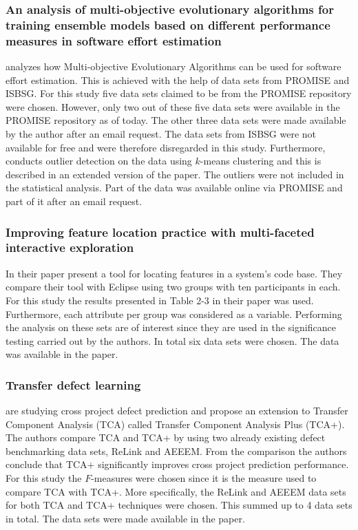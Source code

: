 \subsubsection{An analysis of multi-objective evolutionary algorithms for training ensemble models based on different performance measures in software effort estimation} 
\citet{minku2013analysis} analyzes how Multi-objective Evolutionary Algorithms can be used for software effort estimation. This is achieved with the help of data sets from PROMISE and ISBSG\@. For this study five data sets claimed to be from the PROMISE repository were chosen. However, only two out of these five data sets were available in the PROMISE repository as of today. The other three data sets were made available by the author after an email request. The data sets from ISBSG were not available for free and were therefore disregarded in this study. Furthermore, \citet{minku2013analysis} conducts outlier detection on the data using $k$-means clustering and this is described in an extended version of the paper. The outliers were not included in the statistical analysis. Part of the data was available online via PROMISE and part of it after an email request. 




\subsubsection{Improving feature location practice with multi-faceted interactive exploration}
In their paper \citet{wang2013improving} present a tool for locating features in a system's code base. They compare their tool with Eclipse using two groups with ten participants in each. For this study the results presented in Table 2-3 in their paper was used. Furthermore, each attribute per group was considered as a variable. Performing the analysis on these sets are of interest since they are used in the significance testing carried out by the authors. In total six data sets were chosen. The data was available in the paper.




\subsubsection{Transfer defect learning}
\citet{nam2013transfer} are studying cross project defect prediction and propose an extension to Transfer Component Analysis (TCA) called Transfer Component Analysis Plus (TCA+). The authors compare TCA and TCA+ by using two already existing defect benchmarking data sets, ReLink and AEEEM\@.  From the comparison the authors conclude that TCA+ significantly improves cross project prediction performance. For this study the $F$-measures were chosen since it is the measure used to compare TCA with TCA+.  More specifically, the ReLink and AEEEM data sets for both TCA and TCA+ techniques were chosen. This summed up to 4 data sets in total. The data sets were made available in the paper.




